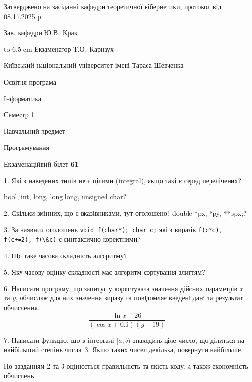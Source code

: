 \documentclass[12pt, ukrainian]{article}
\def\code#1{\Verb!#1!}
\begin{document}
{\smallskip\smallskip \begin {scriptsize} Затверджено на засіданні кафедри теоретичної кібернетики, протокол   від   08.11.2025 р.\par\smallskip\smallskip\smallskip\smallskip
{\parbox {6.5 cm} {Зав. кафедри \dotfill Ю.В.~Крак}}\hspace {0.7cm} {\hbox to 6.5 cm { Екзаменатор \dotfill Т.О.~Карнаух}} \end{scriptsize}}
\newpage
{{\begin {scriptsize}\par
{ \center  Київський національний університет імені Тараса Шевченка \par}
{\parbox {5 cm}{Освітня програма \hfill}{\parbox {7 cm}{Інформатика\hfill}}\parbox {6 cm}{\hfill Семестр 1}}\par
{\parbox {5 cm} {Навчальний предмет \hfill}\parbox {7 cm}{Програмування \hfill}\parbox {6cm}{\hfill}\par}\vspace{-15pt} \end{scriptsize}}{\center Екзаменаційний білет \No \textbf { 61 }\par}}
{%
1. Які з наведених типів не є цілими (integral), якщо такі є серед перелічених?

bool, int, long, long long, unsigned char?
\par
\vspace{2mm}
2. Скільки змінних, що є вказівниками, тут оголошено?
double *px, *py, **ppx;?
\par
\vspace{2mm}
3. За наявних оголошень \code{void f(char*); char c;} які з виразів \code{f(c*c), f(c+=2), f(\&c)} є синтаксично коректними?
\par
\vspace{2mm}
4. Що таке часова складність алгоритму?
\par
\vspace{2mm}
5. Яку часову оцінку складності має алгоритм сортування злиттям?
\par
\vspace{2mm}
6. Написати програму, що запитує у користувача значення дійсних параметрів $x$ та $y$, обчислює для них значення виразу та повiдомляє введенi данi та результат обчислення.
$$\frac{\ln x - 26}{(\cos x + 0.6) (y + 19)}$$ 

\par
7. Написати функцію, що в інтервалі $[a, b)$ знаходить ціле число, що ділиться на найбільший степінь числа 3. Якщо таких чисел декілька, повернути найбільше.

По завданням 2 та 3 оцінюється правильність та якість коду, а також економність обчислень.

}
\end{document}
